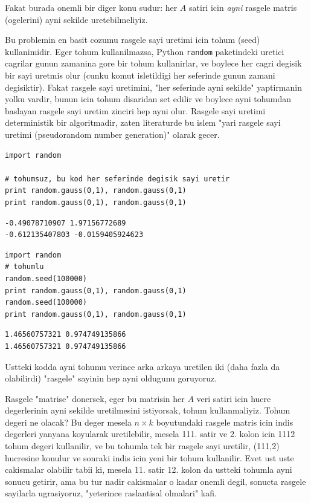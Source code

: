 \documentclass[12pt,fleqn]{article}\usepackage{../common}
\begin{document}
Fakat burada onemli bir diger konu sudur: her $A$ satiri icin {\em ayni}
rasgele matris (ogelerini) ayni sekilde uretebilmeliyiz.

Bu problemin en basit cozumu rasgele sayi uretimi icin tohum (seed)
kullanimidir. Eger tohum kullanilmazsa, Python \verb!random!
paketindeki uretici cagrilar gunun zamanina gore bir tohum
kullanirlar, ve boylece her cagri degisik bir sayi uretmis olur (cunku
komut isletildigi her seferinde gunun zamani degisiktir). Fakat
rasgele sayi uretimini, "her seferinde ayni sekilde" yaptirmanin yolku
vardir, bunun icin tohum disaridan set edilir ve boylece ayni tohumdan
baslayan rasgele sayi uretim zinciri hep ayni olur. Rasgele sayi
uretimi deterministik bir algoritmadir, zaten literaturde bu islem
"yari rasgele sayi uretimi (pseudorandom number generation)" olarak
gecer.

\begin{verbatim}
import random

# tohumsuz, bu kod her seferinde degisik sayi uretir
print random.gauss(0,1), random.gauss(0,1)
print random.gauss(0,1), random.gauss(0,1)
\end{verbatim}

\begin{verbatim}
-0.49078710907 1.97156772689
-0.612135407803 -0.0159405924623
\end{verbatim}

\begin{verbatim}
import random
# tohumlu
random.seed(100000)
print random.gauss(0,1), random.gauss(0,1)
random.seed(100000)
print random.gauss(0,1), random.gauss(0,1)
\end{verbatim}

\begin{verbatim}
1.46560757321 0.974749135866
1.46560757321 0.974749135866
\end{verbatim}

Ustteki kodda ayni tohumu verince arka arkaya uretilen iki (daha fazla
da olabilirdi) "rasgele" sayinin hep ayni oldugunu goruyoruz.

Rasgele "matrise" donersek, eger bu matrisin her $A$ veri satiri icin
hucre degerlerinin ayni sekilde uretilmesini istiyorsak, tohum
kullanmaliyiz. Tohum degeri ne olacak? Bu deger mesela $n \times k$
boyutundaki rasgele matris icin indis degerleri yanyana koyularak
uretilebilir, mesela 111. satir ve 2. kolon icin 1112 tohum degeri
kullanilir, ve bu tohumla tek bir rasgele sayi uretilir, (111,2)
hucresine konulur ve sonraki indis icin yeni bir tohum
kullanilir. Evet ust uste cakismalar olabilir tabii ki, mesela
11. satir 12. kolon da ustteki tohumla ayni sonucu getirir, ama bu tur
nadir cakismalar o kadar onemli degil, sonucta rasgele sayilarla
ugrasiyoruz, "yeterince raslantisal olmalari" kafi.
\end{document}
